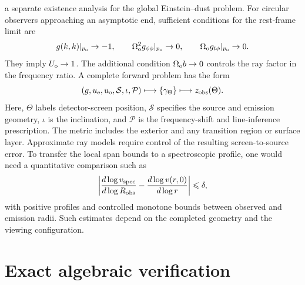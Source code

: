 \documentclass[11pt,a4paper]{article}
\numberwithin{equation}{section}
\theoremstyle{plain}
\theoremstyle{definition}
\theoremstyle{remark}
\begin{document}
a separate existence analysis for the global Einstein--dust problem. For circular observers approaching an asymptotic end, sufficient conditions for the rest-frame limit are
\begin{equation}\label{eq:asymptotic-observer-rest}
g(k,k)|_{p_{\rm o}}\to-1,\qquad
\Omega_{\rm o}^2g_{\phi\phi}|_{p_{\rm o}}\to0,\qquad
\Omega_{\rm o}g_{t\phi}|_{p_{\rm o}}\to0.
\end{equation}
They imply $U_{\rm o}\to 1$. The additional condition
$\Omega_{\rm o}b\to0$ controls the ray factor in the frequency ratio. A complete forward problem has the form
\begin{equation}\label{eq:observable-forward-map}
(g,u_{\rm e},u_{\rm o},\mathcal S,\iota,\mathcal P)
\longmapsto\{\gamma_\Theta\}\longmapsto z_{\rm obs}(\Theta).
\end{equation}
Here, $\Theta$ labels detector-screen position, $\mathcal S$ specifies the
source and emission geometry, $\iota$ is the inclination, and $\mathcal P$
is the frequency-shift and line-inference prescription. The metric includes
the exterior and any transition region or surface layer. Approximate ray
models require control of the resulting screen-to-source error. To transfer the local span bounds to a spectroscopic profile, one would need a quantitative comparison such as
\begin{equation}\label{eq:required-observable-slope-control}
\left|\frac{d\log v_{\rm spec}}{d\log R_{\rm obs}}-\frac{d\log v(r,0)}{d\log r}\right|\leqslant\delta,
\end{equation}
with positive profiles and controlled monotone bounds between observed and
emission radii. Such estimates depend on the completed geometry and the
viewing configuration.

\section{Exact algebraic verification}\label{app:symbolic-reproducibility}
\end{document}
